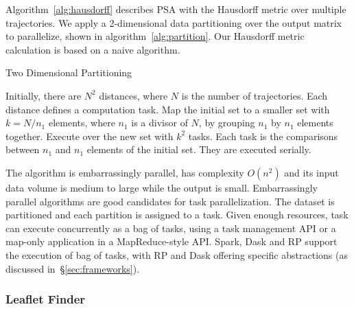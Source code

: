 Algorithm~\ref{alg:hausdorff} describes PSA with the Hausdorff metric over
multiple trajectories. We apply a 2-dimensional data partitioning over the
output matrix to parallelize, shown in algorithm~\ref{alg:partition}. Our
Hausdorff metric calculation is based on a naive algorithm.

\begin{algorithm}[t]
    \scriptsize
    \caption{Two Dimensional Partitioning}
    \label{alg:partition}
    \begin{algorithmic}[1]
        \State Initially, there are $N^2$ distances, where $N$ is the number of trajectories.
        Each distance defines a computation task.
        \State Map the initial set to a smaller set with $k=N/n_1$ elements, where $n_1$ is a divisor of $N$, by grouping $n_1$ by $n_1$ elements together.
        \State Execute over the new set with $k^2$ tasks.
        Each task is the comparisons between $n_1$ and $n_1$  elements of the initial set.
        They are executed serially.
    \end{algorithmic}
\end{algorithm}

The algorithm is embarrassingly parallel, has complexity $O(n^2)$ and its input
data volume is medium to large while the output is small.
Embarrassingly parallel algorithms are good candidates for task parallelization.
The dataset is partitioned and each partition is assigned to a task. Given
enough resources, task can execute concurrently as a bag of tasks, using a task
management API or a map-only application in a MapReduce-style API. Spark, Dask
and RP support the execution of bag of tasks, with RP and
Dask offering specific abstractions (as discussed in~\S\ref{sec:frameworks}).

\subsubsection*{Leaflet Finder}

